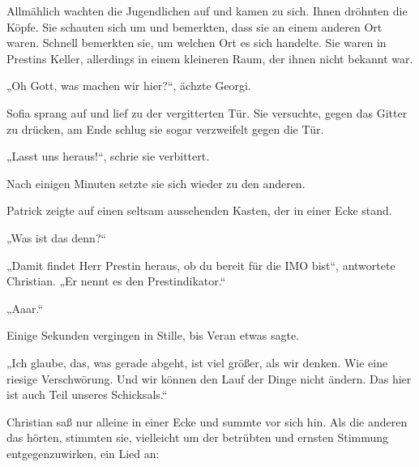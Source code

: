 \documentclass[oneside]{memoir}
\begin{document}
Allmählich wachten die Jugendlichen auf und kamen zu sich. Ihnen dröhnten die Köpfe. Sie schauten sich um und bemerkten, dass sie an einem anderen Ort waren. Schnell bemerkten sie, um welchen Ort es sich handelte. Sie waren in Prestins Keller, allerdings in einem kleineren Raum, der ihnen nicht bekannt war.

„Oh Gott, was machen wir hier?“, ächzte Georgi.

Sofia sprang auf und lief zu der vergitterten Tür. Sie versuchte, gegen das Gitter zu drücken, am Ende schlug sie sogar verzweifelt gegen die Tür.

„Lasst uns heraus!“, schrie sie verbittert.

Nach einigen Minuten setzte sie sich wieder zu den anderen.

Patrick zeigte auf einen seltsam aussehenden Kasten, der in einer Ecke stand.

„Was ist das denn?“

„Damit findet Herr Prestin heraus, ob du bereit für die IMO bist“, antwortete Christian. „Er nennt es den Prestindikator.“

„Aaar.“

Einige Sekunden vergingen in Stille, bis Veran etwas sagte.

„Ich glaube, das, was gerade abgeht, ist viel größer, als wir denken. Wie eine riesige Verschwörung. Und wir können den Lauf der Dinge nicht ändern. Das hier ist auch Teil unseres Schicksals.“

Christian saß nur alleine in einer Ecke und summte vor sich hin. Als die anderen das hörten, stimmten sie, vielleicht um der betrübten und ernsten Stimmung entgegenzuwirken, ein Lied an: \\
\end{document}
